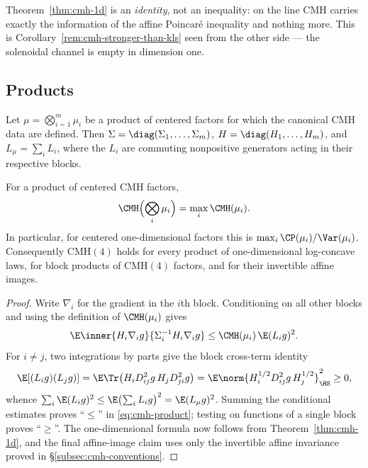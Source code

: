 \documentclass[../../main.tex]{subfiles}
\begin{document}
Theorem~\ref{thm:cmh-1d} is an \emph{identity}, not an inequality: on the line CMH carries
exactly the information of the affine Poincar\'e inequality and nothing more. This is
Corollary~\ref{rem:cmh-stronger-than-kls} seen from the other side --- the solenoidal channel is
empty in dimension one.

\subsection{Products}
\label{subsec:cmh-product}

Let $\mu=\bigotimes_{i=1}^m\mu_i$ be a product of centered factors for which the canonical CMH
data are defined. Then $\Sigma=\diag(\Sigma_1,\dots,\Sigma_m)$,
$H=\diag(H_1,\dots,H_m)$, and $L_\mu=\sum_iL_i$, where the $L_i$ are commuting nonpositive
generators acting in their respective blocks.

\begin{theorem}
\label{thm:cmh-product}
For a product of centered CMH factors,
\begin{equation}
  \CMH\Bigl(\bigotimes_i\mu_i\Bigr)=\max_i\CMH(\mu_i).
  \label{eq:cmh-product}
\end{equation}
In particular, for centered one-dimensional factors this is
$\max_i\CP(\mu_i)/\Var(\mu_i)$. Consequently $\mathrm{CMH}(4)$ holds for every product of
one-dimensional log-concave laws, for block products of $\mathrm{CMH}(4)$ factors, and for their
invertible affine images.
\end{theorem}

\begin{proof}
Write $\nabla_i$ for the gradient in the $i$th block. Conditioning on all other blocks and
using the definition of $\CMH(\mu_i)$ gives
\[
  \E\inner{H_i\nabla_i g}{\Sigma_i^{-1}H_i\nabla_i g}
  \le \CMH(\mu_i)\,\E(L_i g)^2.
\]
For $i\ne j$, two integrations by parts give the block cross-term identity
\begin{equation}
  \E[(L_ig)(L_jg)]
  =\E\Tr\!\left(H_iD^2_{ij}g\,H_jD^2_{ji}g\right)
  =\E\norm{H_i^{1/2}D^2_{ij}g\,H_j^{1/2}}_{\HS}^2\ge0,
  \label{eq:cmh-product-cross}
\end{equation}
whence $\sum_i\E(L_ig)^2\le\E\bigl(\sum_iL_ig\bigr)^2=\E(L_\mu g)^2$. Summing the conditional
estimates proves ``$\le$'' in \eqref{eq:cmh-product}; testing on functions of a single block
proves ``$\ge$''. The one-dimensional formula now follows from
Theorem~\ref{thm:cmh-1d}, and the final affine-image claim uses only the invertible affine
invariance proved in \S\ref{subsec:cmh-conventions}.
\end{proof}
\end{document}
